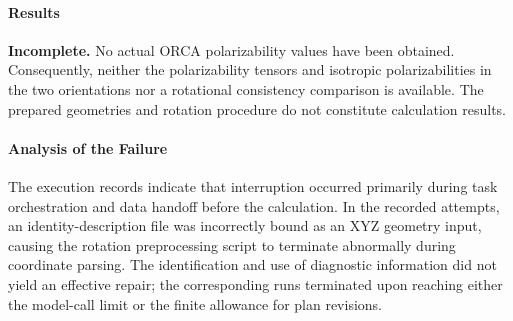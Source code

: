 \paragraph{Results}
\textbf{Incomplete.} No actual ORCA polarizability values have been obtained.
Consequently, neither the polarizability tensors and isotropic polarizabilities in the two orientations nor a rotational consistency comparison is available.
The prepared geometries and rotation procedure do not constitute calculation results.

\paragraph{Analysis of the Failure}
The execution records indicate that interruption occurred primarily during task orchestration and data handoff before the calculation.
In the recorded attempts, an identity-description file was incorrectly bound as an XYZ geometry input, causing the rotation preprocessing script to terminate abnormally during coordinate parsing.
The identification and use of diagnostic information did not yield an effective repair; the corresponding runs terminated upon reaching either the model-call limit or the finite allowance for plan revisions.
